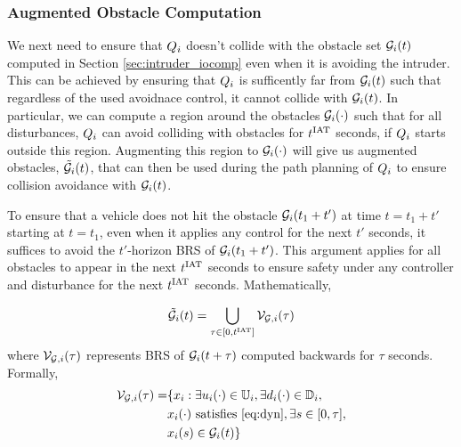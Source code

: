 \subsubsection{Augmented Obstacle Computation \label{sec:intruder_aocomp}}
We next need to ensure that $Q_i$ doesn't collide with the obstacle set $\mathcal{G}_i(t)$ computed in Section \ref{sec:intruder_iocomp} even when it is avoiding the intruder. This can be achieved by ensuring that $Q_i$ is sufficently far from $\mathcal{G}_i(t)$ such that regardless of the used avoidnace control, it cannot collide with $\mathcal{G}_i(t)$. In particular, we can compute a region around the obstacles $\mathcal{G}_i(\cdot)$ such that for all disturbances, $Q_i$ can avoid colliding with obstacles for $t^\text{IAT}$ seconds, if $Q_i$ starts outside this region. Augmenting this region to $\mathcal{G}_i(\cdot)$ will give us augmented obstacles, $\tilde{\mathcal{G}}_i(t)$, that can then be used during the path planning of $Q_i$ to ensure collision avoidance with $\mathcal{G}_i(t)$.  

To ensure that a vehicle does not hit the obstacle $\mathcal{G}_i(t_1 + t')$ at time $t = t_1 + t'$ starting at $t = t_1$, even when it applies any control for the next $t'$ seconds, it suffices to avoid the $t'$-horizon BRS of $\mathcal{G}_i(t_1 + t')$. This argument applies for all obstacles to appear in the next $t^\text{IAT}$ seconds to ensure safety under any controller and disturbance for the next $t^\text{IAT}$ seconds. Mathematically,

\begin{equation} \label{eqn:inducedobs}
\tilde\obsset_i(t) = \bigcup_{\tau \in [0, \iat]} \brs_{\mathcal{G}, i}(\tau)
\end{equation}
where $\mathcal{V}_{\mathcal{G}, i}(\tau)$ represents BRS of $\mathcal{G}_i(t+\tau)$ computed backwards for $\tau$ seconds. Formally, 
\begin{equation} \label{eqn:inducedobs_help1}
\begin{aligned}
\brs_{\mathcal{G}, i}(\tau) = & \{\state_i: \exists \ctrl_i(\cdot) \in \cfset_i, \exists \dstb_i(\cdot) \in \dfset_i, \\
& \state_i(\cdot) \text{ satisfies \eqref{eq:dyn}}, \exists s \in [0, \tau], \\
& \state_i(s) \in \obsset_i(t)\}
\end{aligned}
\end{equation}

